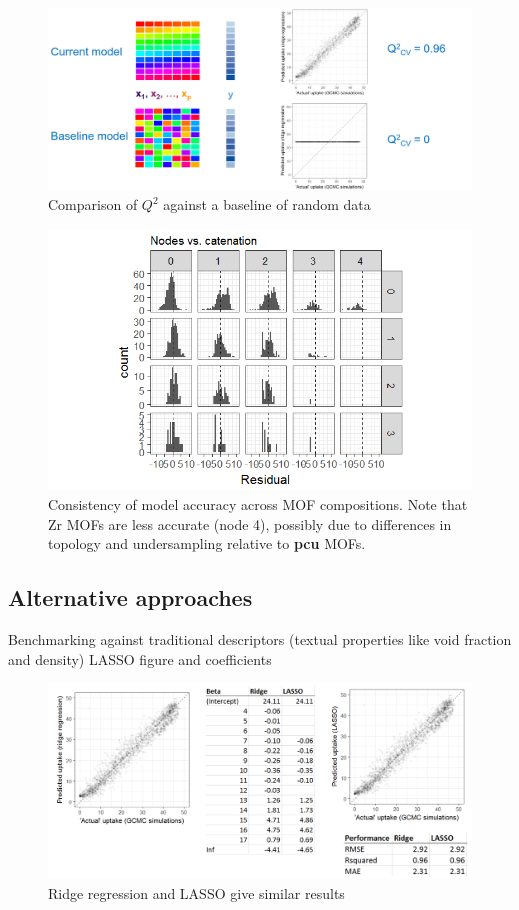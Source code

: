 \documentclass[letterpaper]{article}
\begin{document}
\begin{figure}[!ht]
	\centering
	\includegraphics[width=0.75\columnwidth]{Figs/random_baseline.png}
	\caption{Comparison of $Q^2$ against a baseline of random data}
	\label{fig:q2_baseline}
\end{figure}

\begin{figure}[!ht]
	\centering
	\includegraphics[width=0.75\columnwidth]{Figs/consistency_across_compositions.png}
	\caption{Consistency of model accuracy across MOF compositions.  Note that Zr MOFs are less accurate (node 4), possibly due to differences in topology and undersampling relative to \textbf{pcu} MOFs.}
	\label{fig:nodes_vs_cat}
\end{figure}

\subsection{Alternative approaches}

\begin{outline}
	\1 Benchmarking against traditional descriptors (textual properties like void fraction and density)
	\1 LASSO figure and coefficients
	\begin{figure}[!ht]
		\centering
		\includegraphics[width=0.75\columnwidth]{Figs/ridge_vs_lasso.png}
		\caption{Ridge regression and LASSO give similar results}
		\label{fig:lasso}
	\end{figure}
	
\end{outline}
\end{document}

